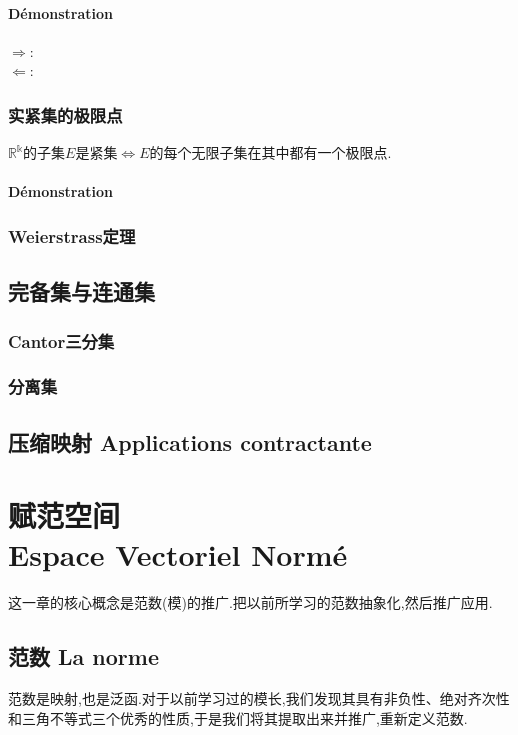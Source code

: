\documentclass[12pt, a4paper, oneside]{ctexbook}
\begin{document}
  \subsubsection{Démonstration}
  \noindent
  $\Rightarrow$:\\
  $\Leftarrow$:\\

  \subsection{实紧集的极限点}
  $\mathbb{R^k}$的子集$E$是紧集$\Leftrightarrow$$E$的每个无限子集在其中都有一个极限点.
  \subsubsection{Démonstration}
  \subsection{Weierstrass定理}

  \section{完备集与连通集}
  \subsection{Cantor三分集}
  \subsection{分离集}
  \section{压缩映射 Applications contractante}\label{myref:yasuoyingshe}

  

\chapter{赋范空间\\Espace Vectoriel Normé}
  这一章的核心概念是范数(模)的推广.把以前所学习的范数抽象化,然后推广应用.
\section{范数 La norme}
  范数是映射,也是泛函.对于以前学习过的模长,我们发现其具有非负性、绝对齐次性和三角不等式三个优秀的性质,于是我们将其提取出来并推广,重新定义范数.
\end{document}

